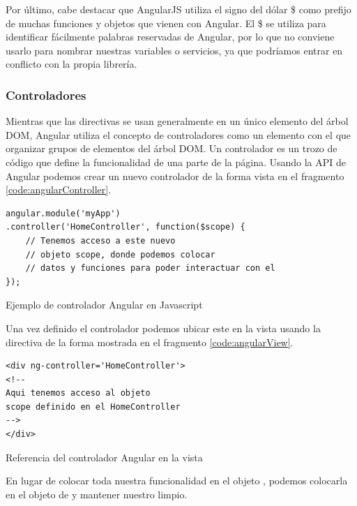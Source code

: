 Por último, cabe destacar que AngularJS utiliza el signo del dólar \$ como prefijo de muchas funciones y objetos que vienen con Angular. El \$ se utiliza para identificar fácilmente palabras reservadas de Angular, por lo que no conviene usarlo para nombrar nuestras variables o servicios, ya que podríamos entrar en conflicto con la propia librería.

\subsubsection{Controladores}
Mientras que las directivas se usan generalmente en un único elemento del árbol DOM, Angular utiliza el concepto de controladores como un elemento con el que organizar grupos de elementos del árbol DOM.
Un controlador es un trozo de código que define la funcionalidad de una parte de la página. Usando la API de Angular podemos crear un nuevo controlador de la forma vista en el fragmento \ref{code:angularController}.

\begin{listing}[h] 
\begin{verbatim}
angular.module('myApp')
.controller('HomeController', function($scope) {
    // Tenemos acceso a este nuevo
    // objeto scope, donde podemos colocar
    // datos y funciones para poder interactuar con el
});
\end{verbatim}
\caption{Ejemplo de controlador Angular en Javascript}
\label{code:angularController}
\end{listing}

Una vez definido el controlador podemos ubicar este en la vista usando la directiva  de la forma mostrada en el fragmento \ref{code:angularView}.

\begin{listing}[h] 
\begin{verbatim}
<div ng-controller='HomeController'>
<!--
Aqui tenemos acceso al objeto
scope definido en el HomeController
-->
</div>
\end{verbatim}
\caption{Referencia del controlador Angular en la vista}
\label{code:angularView}
\end{listing}

En lugar de colocar toda nuestra funcionalidad en el objeto , podemos colocarla en el objeto  de  y mantener nuestro  limpio.

